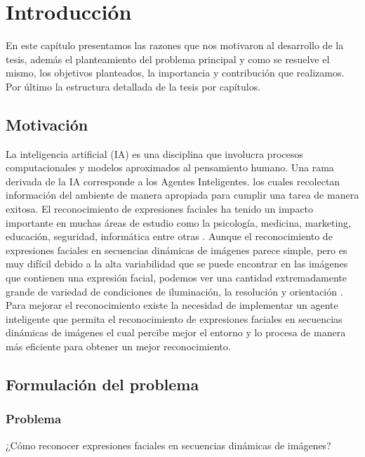 \chapter{Introducción}
\setcounter{page}{1}

En este capítulo presentamos las razones que nos motivaron al desarrollo de la tesis, además el planteamiento del problema principal y como se resuelve el mismo, los objetivos planteados, la importancia y contribución que realizamos. Por último la estructura detallada de la tesis por capítulos.   

\section{Motivación}

La inteligencia artificial (IA) es una disciplina que involucra procesos computacionales y modelos aproximados al pensamiento humano. Una rama derivada de la IA corresponde a los Agentes Inteligentes. los cuales recolectan información del ambiente de manera apropiada para cumplir una tarea de manera exitosa.
\vskip 0.3cm
El reconocimiento de expresiones faciales ha tenido un impacto importante en muchas áreas de estudio como la psicología,  medicina, marketing, educación, seguridad, informática entre otras \citep{Fang}.
\vskip 0.3cm
Aunque el reconocimiento de expresiones faciales en secuencias dinámicas de imágenes parece simple, pero es muy difícil debido a la alta variabilidad que se puede encontrar en las imágenes que contienen una expresión facial, podemos ver una cantidad extremadamente grande de variedad de condiciones de iluminación, la resolución y orientación \citep{Bajaj}. 
\vskip 0.3cm
Para mejorar el reconocimiento existe la necesidad de implementar un agente inteligente que permita el reconocimiento de expresiones faciales en secuencias dinámicas de imágenes el cual percibe mejor el entorno y lo procesa de manera más eficiente para obtener un mejor reconocimiento.

\section{Formulación del problema}
\subsection{Problema}

 \begin{center}   
     ¿Cómo reconocer expresiones faciales en secuencias dinámicas de imágenes?
 \end{center}

